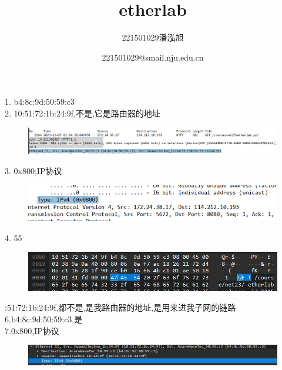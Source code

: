 \documentclass{article}
\begin{document}
\title{etherlab}
\author{221501029潘泓旭}
\date{221501029@smail.nju.edu.cn}
\maketitle
\noindent

1.  b4:8c:9d:50:59:c3\\
2.  10:51:72:1b:24:9f,不是,它是路由器的地址\\
\begin{figure}[htbp]
    \centering
    \includegraphics[width=1\textwidth]{pic/p1.png} %
\end{figure}

3.  0x800;IP协议\\
\begin{figure}[htbp]
    \centering
    \includegraphics[width=1\textwidth]{pic/p2.png} %
\end{figure}

4.  55\\
\begin{figure}[htbp]
    \centering
    \includegraphics[width=1\textwidth]{pic/p3.png} %
\end{figure}
:51:72:1b:24:9f,都不是,是我路由器的地址,是用来进我子网的链路\\
6.b4:8c:9d:50:59:c3,是\\
7.0x800,IP协议\\

\begin{figure}[htbp]
    \centering
    \includegraphics[width=1\textwidth]{pic/p5.png} %
\end{figure}
\end{document}
